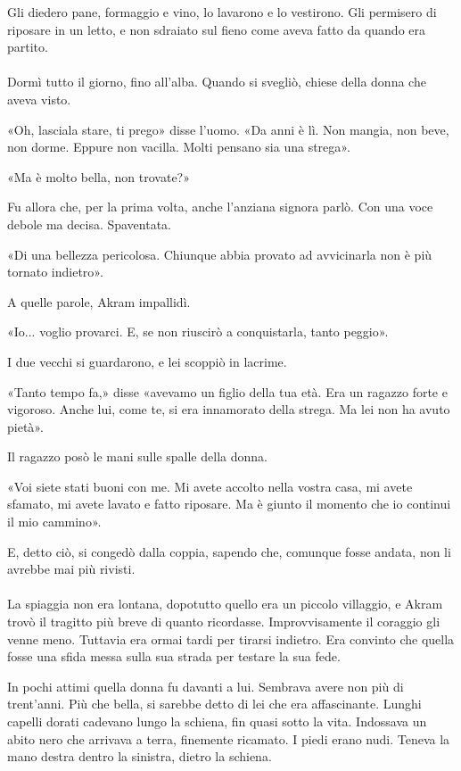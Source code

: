 \documentclass[a4paper,12pt]{book}
\begin{document}
Gli diedero pane, formaggio e vino, lo lavarono e lo vestirono. Gli permisero di
riposare in un letto, e non sdraiato sul fieno come aveva fatto da quando era
partito.

\paragraph{}
Dormì tutto il giorno, fino all'alba. Quando si svegliò, chiese della donna
che aveva visto.

«Oh, lasciala stare, ti prego» disse l'uomo. «Da anni è lì. Non mangia, non
beve, non dorme. Eppure non vacilla. Molti pensano sia una strega».

«Ma è molto bella, non trovate?»

Fu allora che, per la prima volta, anche l'anziana signora parlò. Con una voce
debole ma decisa. Spaventata.

«Di una bellezza pericolosa. Chiunque abbia provato ad avvicinarla non è più
tornato indietro».

A quelle parole, Akram impallidì.

«Io... voglio provarci. E, se non riuscirò a conquistarla, tanto peggio».

I due vecchi si guardarono, e lei scoppiò in lacrime.

«Tanto tempo fa,» disse «avevamo un figlio della tua età. Era un ragazzo
forte e vigoroso. Anche lui, come te, si era innamorato della strega. Ma lei non
ha avuto pietà».

Il ragazzo posò le mani sulle spalle della donna.

«Voi siete stati buoni con me. Mi avete accolto nella vostra casa, mi avete
sfamato, mi avete lavato e fatto riposare. Ma è giunto il momento che io
continui il mio cammino».

E, detto ciò, si congedò dalla coppia, sapendo che, comunque fosse andata, non
li avrebbe mai più rivisti.

\paragraph{}
La spiaggia non era lontana, dopotutto quello era un piccolo villaggio, e Akram
trovò il tragitto più breve di quanto ricordasse. Improvvisamente il coraggio
gli venne meno. Tuttavia era ormai tardi per tirarsi indietro. Era convinto che
quella fosse una sfida messa sulla sua strada per testare la sua fede.

In pochi attimi quella donna fu davanti a lui. Sembrava avere non più di
trent'anni. Più che bella, si sarebbe detto di lei che era affascinante. Lunghi
capelli dorati cadevano lungo la schiena, fin quasi sotto la vita. Indossava un
abito nero che arrivava a terra, finemente ricamato. I piedi erano nudi. Teneva
la mano destra dentro la sinistra, dietro la schiena.
\end{document}
